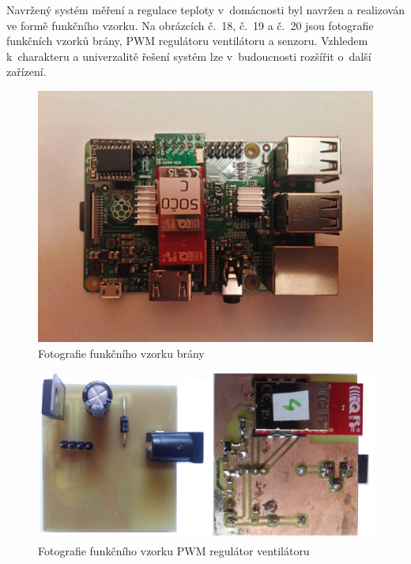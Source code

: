 \documentclass[12pt,a4paper]{article}
\begin{document}

Navržený systém měření a regulace teploty v~domácnosti byl navržen a realizován ve formě funkčního vzorku. Na obrázcích č.~18, č.~19 a č.~20 jsou fotografie funkčních vzorků brány, PWM regulátoru ventilátoru a senzoru. Vzhledem k~charakteru a univerzalitě řešení systém lze v~budoucnosti rozšířit o~další zařízení.

\begin{figure}[H]
\centering
\label{fig:foto/brana}
\includegraphics[width = 150mm]{img/foto/brana.jpg}
\caption{Fotografie funkčního vzorku brány}
\end{figure}

\begin{figure}[H]
\centering
\label{fig:foto/iqrf-pwm-fan-controller}
\includegraphics[width = 150mm]{img/foto/iqrf-pwm-fan-controller.jpg}
\caption{Fotografie funkčního vzorku PWM regulátor ventilátoru}
\end{figure}
\end{document}
